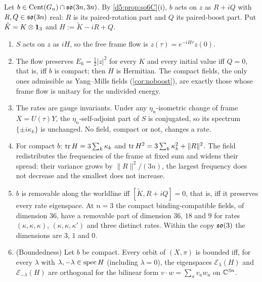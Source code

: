 \begin{theorem}
\label{d7:thm:schr}
Let $b\in\operatorname{Cent}(G_n)\cap\mathfrak{so}(3n,3n)$. By \cref{d5:prop:so6C}(i), $b$ acts on $z$ as $R+iQ$ with $R,Q\in\mathfrak{so}(3n)$ real: $R$ is
its paired-rotation part and $Q$ its paired-boost part. Put $\tilde K=K\otimes\mathbf 1_3$ and $H:=\tilde K-iR+Q$.
\begin{enumerate}[label=(\roman*),leftmargin=2.2em]
\item $S$ acts on $z$ as $iH$, so the free frame flow is $z(\tau)=e^{-iH\tau}z(0)$.
\item The flow preserves $E_6=\tfrac12|z|^2$ for every $K$ and every initial value iff $Q=0$, that is, iff $b$ is compact; then $H$ is Hermitian. The
compact fields, the only ones admissible as Yang--Mills fields (\cref{cor:noboost}), are exactly those whose frame flow is unitary for the
undivided energy.
\item The rates are gauge invariants. Under any $\eta_n$-isometric change of frame $X=U(\tau)Y$, the $\eta_n$-self-adjoint part of $S$ is conjugated,
so its spectrum $\{\pm i\kappa_k\}$ is unchanged. No field, compact or not, changes a rate.
\item For compact $b$: $\operatorname{tr} H=3\sum_k\kappa_k$ and $\operatorname{tr} H^2=3\sum_k\kappa_k^2+\|R\|^2$. The field redistributes the frequencies of the frame at fixed
sum and widens their spread: their variance grows by $\|R\|^2/(3n)$, the largest frequency does not decrease and the smallest does not increase.
\item $b$ is removable along the worldline iff $[\tilde K,R+iQ]=0$, that is, iff it preserves every rate eigenspace. At $n=3$ the compact
binding-compatible fields, of dimension $36$, have a removable part of dimension $36$, $18$ and $9$ for rates $(\kappa,\kappa,\kappa)$, $(\kappa,\kappa,\kappa')$
and three distinct rates. Within the copy $\mathfrak{so}(3)$ the dimensions are $3$, $1$ and $0$.
\item (Boundedness) Let $b$ be compact. Every orbit of $(X,\pi)$ is bounded iff, for every $\lambda$ with $\lambda,-\lambda\in\operatorname{spec} H$ (including $\lambda=0$),
the eigenspaces $\mathcal E_\lambda(H)$ and $\mathcal E_{-\lambda}(H)$ are orthogonal for the bilinear form $v\cdot w=\sum_av_aw_a$ on $\mathbb{C}^{3n}$.
\end{enumerate}
\end{theorem}

